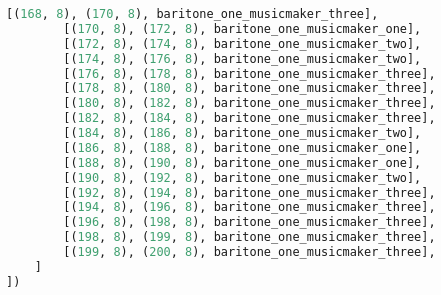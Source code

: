 \begin{lstlisting}[language=Python, caption=Invocation Source Code]
        [(168, 8), (170, 8), baritone_one_musicmaker_three],
        [(170, 8), (172, 8), baritone_one_musicmaker_one],
        [(172, 8), (174, 8), baritone_one_musicmaker_two],
        [(174, 8), (176, 8), baritone_one_musicmaker_two],
        [(176, 8), (178, 8), baritone_one_musicmaker_three],
        [(178, 8), (180, 8), baritone_one_musicmaker_three],
        [(180, 8), (182, 8), baritone_one_musicmaker_three],
        [(182, 8), (184, 8), baritone_one_musicmaker_three],
        [(184, 8), (186, 8), baritone_one_musicmaker_two],
        [(186, 8), (188, 8), baritone_one_musicmaker_one],
        [(188, 8), (190, 8), baritone_one_musicmaker_one],
        [(190, 8), (192, 8), baritone_one_musicmaker_two],
        [(192, 8), (194, 8), baritone_one_musicmaker_three],
        [(194, 8), (196, 8), baritone_one_musicmaker_three],
        [(196, 8), (198, 8), baritone_one_musicmaker_three],
        [(198, 8), (199, 8), baritone_one_musicmaker_three],
        [(199, 8), (200, 8), baritone_one_musicmaker_three],
    ]
])


\end{lstlisting}
